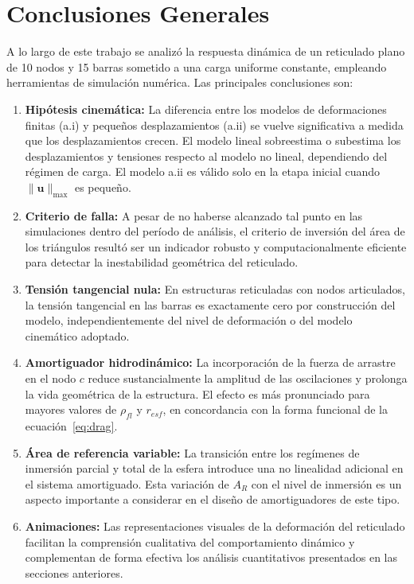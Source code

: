 \documentclass[12pt]{article}
\begin{document}
\section{Conclusiones Generales}

A lo largo de este trabajo se analizó la respuesta dinámica de un reticulado plano de 10 nodos y 15 barras sometido a una carga uniforme constante, empleando herramientas de simulación numérica. Las principales conclusiones son:

\begin{enumerate}
    \item \textbf{Hipótesis cinemática:} La diferencia entre los modelos de deformaciones finitas (a.i) y pequeños desplazamientos (a.ii) se vuelve significativa a medida que los desplazamientos crecen. El modelo lineal sobreestima o subestima los desplazamientos y tensiones respecto al modelo no lineal, dependiendo del régimen de carga. El modelo a.ii es válido solo en la etapa inicial cuando $\|\mathbf{u}\|_{\max}$ es pequeño.

    \item \textbf{Criterio de falla:} A pesar de no haberse alcanzado tal punto en las simulaciones dentro del período de análisis, el criterio de inversión del área de los triángulos resultó ser un indicador robusto y computacionalmente eficiente para detectar la inestabilidad geométrica del reticulado.

    \item \textbf{Tensión tangencial nula:} En estructuras reticuladas con nodos articulados, la tensión tangencial en las barras es exactamente cero por construcción del modelo, independientemente del nivel de deformación o del modelo cinemático adoptado.

    \item \textbf{Amortiguador hidrodinámico:} La incorporación de la fuerza de arrastre en el nodo $c$ reduce sustancialmente la amplitud de las oscilaciones y prolonga la vida geométrica de la estructura. El efecto es más pronunciado para mayores valores de $\rho_{fl}$ y $r_{esf}$, en concordancia con la forma funcional de la ecuación~\eqref{eq:drag}.

    \item \textbf{Área de referencia variable:} La transición entre los regímenes de inmersión parcial y total de la esfera introduce una no linealidad adicional en el sistema amortiguado. Esta variación de $A_R$ con el nivel de inmersión es un aspecto importante a considerar en el diseño de amortiguadores de este tipo.

    \item \textbf{Animaciones:} Las representaciones visuales de la deformación del reticulado facilitan la comprensión cualitativa del comportamiento dinámico y complementan de forma efectiva los análisis cuantitativos presentados en las secciones anteriores.
\end{enumerate}
\end{document}
